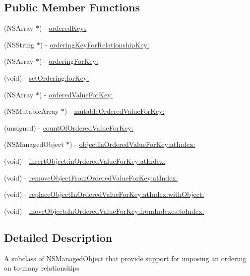 \subsection*{Public Member Functions}
\begin{DoxyCompactItemize}
\item 
(NSArray $\ast$) -\/ \hyperlink{interface_b_w_ordered_managed_object_a3b7b006e5dbf3b5da19442ccd30c7969}{orderedKeys}
\item 
(NSString $\ast$) -\/ \hyperlink{interface_b_w_ordered_managed_object_ad0692503af87a1bcf276f7e3c752829d}{orderingKeyForRelationshipKey:}
\item 
(NSArray $\ast$) -\/ \hyperlink{interface_b_w_ordered_managed_object_ab0625646f630aa2e8aa0409b416474e4}{orderingForKey:}
\item 
(void) -\/ \hyperlink{interface_b_w_ordered_managed_object_a18a349d2c91511b606abf47492c73556}{setOrdering:forKey:}
\item 
(NSArray $\ast$) -\/ \hyperlink{interface_b_w_ordered_managed_object_ae0c5c3c9b315eaf00cff7dd19b47e942}{orderedValueForKey:}
\item 
(NSMutableArray $\ast$) -\/ \hyperlink{interface_b_w_ordered_managed_object_a4337f8a96827013c2c5cf796c7cc9052}{mutableOrderedValueForKey:}
\item 
(unsigned) -\/ \hyperlink{interface_b_w_ordered_managed_object_acc1e7219358d050b0a215e6f8543027e}{countOfOrderedValueForKey:}
\item 
(NSManagedObject $\ast$) -\/ \hyperlink{interface_b_w_ordered_managed_object_ab047379bcc7f258f953f790465c63b2f}{objectInOrderedValueForKey:atIndex:}
\item 
(void) -\/ \hyperlink{interface_b_w_ordered_managed_object_aa154c884fcf3437633ef336d8083f340}{insertObject:inOrderedValueForKey:atIndex:}
\item 
(void) -\/ \hyperlink{interface_b_w_ordered_managed_object_a636a8bb46bebe9f798bf2fa8218aa488}{removeObjectFromOrderedValueForKey:atIndex:}
\item 
(void) -\/ \hyperlink{interface_b_w_ordered_managed_object_a15b3597d3b688271d46841d009da0f78}{replaceObjectInOrderedValueForKey:atIndex:withObject:}
\item 
(void) -\/ \hyperlink{interface_b_w_ordered_managed_object_a7d09d2f428f979fb55874a9888e77ae7}{moveObjectsInOrderedValueForKey:fromIndexes:toIndex:}
\end{DoxyCompactItemize}


\subsection{Detailed Description}
A subclass of NSManagedObject that provide support for imposing an ordering on to-\/many relationships

